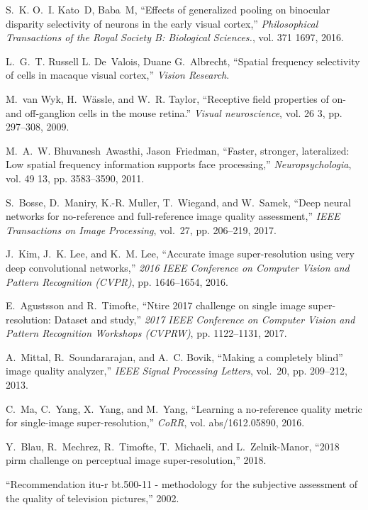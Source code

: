 \documentclass[10pt,twocolumn,letterpaper]{article}
\begin{document}
{\begin{thebibliography}{10}
S.~K. O.~I. Kato~D, Baba~M, ``Effects of generalized pooling on binocular
  disparity selectivity of neurons in the early visual cortex,''
  \emph{Philosophical Transactions of the Royal Society B: Biological
  Sciences.}, vol. 371 1697, 2016.

L.~G.~T. Russell L. De~Valois, Duane G.~Albrecht, ``Spatial frequency
  selectivity of cells in macaque visual cortex,'' \emph{Vision Research}.

M.~van Wyk, H.~W{\"a}ssle, and W.~R. Taylor, ``Receptive field properties of
  on- and off-ganglion cells in the mouse retina.'' \emph{Visual neuroscience},
  vol. 26 3, pp. 297--308, 2009.

M.~A.~W. Bhuvanesh~Awasthi, Jason~Friedman, ``Faster, stronger, lateralized:
  Low spatial frequency information supports face processing,''
  \emph{Neuropsychologia}, vol. 49 13, pp. 3583--3590, 2011.

S.~Bosse, D.~Maniry, K.-R. Muller, T.~Wiegand, and W.~Samek, ``Deep neural
  networks for no-reference and full-reference image quality assessment,''
  \emph{IEEE Transactions on Image Processing}, vol.~27, pp. 206--219, 2017.

J.~Kim, J.~K. Lee, and K.~M. Lee, ``Accurate image super-resolution using very
  deep convolutional networks,'' \emph{2016 IEEE Conference on Computer Vision
  and Pattern Recognition (CVPR)}, pp. 1646--1654, 2016.

E.~Agustsson and R.~Timofte, ``Ntire 2017 challenge on single image
  super-resolution: Dataset and study,'' \emph{2017 IEEE Conference on Computer
  Vision and Pattern Recognition Workshops (CVPRW)}, pp. 1122--1131, 2017.

A.~Mittal, R.~Soundararajan, and A.~C. Bovik, ``Making a completely blind”
  image quality analyzer,'' \emph{IEEE Signal Processing Letters}, vol.~20, pp.
  209--212, 2013.

C.~Ma, C.~Yang, X.~Yang, and M.~Yang, ``Learning a no-reference quality metric
  for single-image super-resolution,'' \emph{CoRR}, vol. abs/1612.05890, 2016.

Y.~Blau, R.~Mechrez, R.~Timofte, T.~Michaeli, and L.~Zelnik-Manor, ``2018 pirm
  challenge on perceptual image super-resolution,'' 2018.

``Recommendation itu-r bt.500-11 - methodology for the subjective assessment of
  the quality of television pictures,'' 2002.


\end{thebibliography}}
\end{document}

